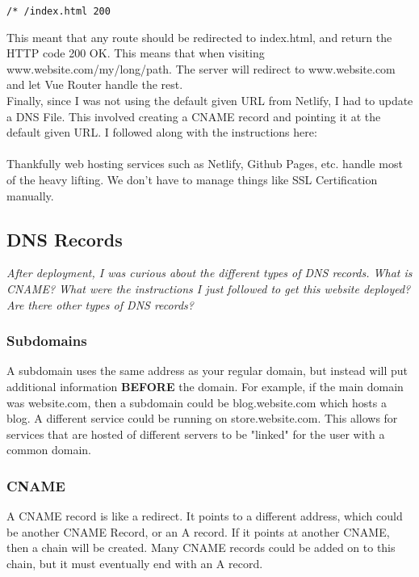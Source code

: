 \documentclass[portfolio.tex]{subfiles}
\begin{document}
		 	\begin{lstlisting}
/* /index.html 200
		 	\end{lstlisting}

	 		\bigbreak
	 		This meant that any route should be redirected to index.html, and return the HTTP code 200 OK. This means that when visiting www.website.com/my/long/path. The server will redirect to www.website.com and let Vue Router handle the rest. \autocite{vue-router} \\

	 		Finally, since I was not using the default given URL from Netlify, I had to update a DNS File. This involved creating a CNAME record and pointing it at the default given URL. I followed along with the instructions here: \\

	 		\\

	 		Thankfully web hosting services such as Netlify, Github Pages, etc. handle most of the heavy lifting. We don't have to manage things like SSL Certification manually.

	 	\subsection{DNS Records}
	 		\textit{After deployment, I was curious about the different types of DNS records. What is CNAME? What were the instructions I just followed to get this website deployed? Are there other types of DNS records?}\\

	 		\subsubsection{Subdomains}
	 			A subdomain uses the same address as your regular domain, but instead will put additional information \textbf{BEFORE} the domain. For example, if the main domain was website.com, then a subdomain could be blog.website.com which hosts a blog. A different service could be running on store.website.com. This allows for services that are hosted of different servers to be "linked" for the user with a common domain.

	 		\subsubsection{CNAME}
	 			A CNAME record is like a redirect. It points to a different address, which could be another CNAME Record, or an A record. If it points at another CNAME, then a chain will be created. Many CNAME records could be added on to this chain, but it must eventually end with an A record.\\
\end{document}
